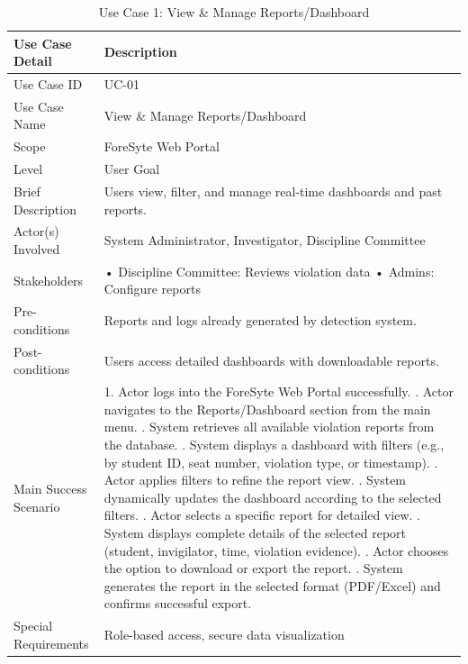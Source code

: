 \begin{longtable}{|p{5cm}|p{10cm}|}
\caption{Use Case 1: View \& Manage Reports/Dashboard} \label{uc01} \\

\hline
\textbf{Use Case Detail} & \textbf{Description} \\ \hline
Use Case ID & UC-01 \\ \hline
Use Case Name & View \& Manage Reports/Dashboard \\ \hline
Scope & ForeSyte Web Portal \\ \hline
Level & User Goal \\ \hline
Brief Description & Users view, filter, and manage real-time dashboards and past reports. \\ \hline
Actor(s) Involved & System Administrator, Investigator, Discipline Committee \\ \hline
Stakeholders & • Discipline Committee: Reviews violation data \newline • Admins: Configure reports \\ \hline
Pre-conditions & Reports and logs already generated by detection system. \\ \hline
Post-conditions & Users access detailed dashboards with downloadable reports. \\ \hline
Main Success Scenario & 
1. Actor logs into the ForeSyte Web Portal successfully. \newline
2. Actor navigates to the Reports/Dashboard section from the main menu. \newline
3. System retrieves all available violation reports from the database. \newline
4. System displays a dashboard with filters (e.g., by student ID, seat number, violation type, or timestamp). \newline
5. Actor applies filters to refine the report view. \newline
6. System dynamically updates the dashboard according to the selected filters. \newline
7. Actor selects a specific report for detailed view. \newline
8. System displays complete details of the selected report (student, invigilator, time, violation evidence). \newline
9. Actor chooses the option to download or export the report. \newline
10. System generates the report in the selected format (PDF/Excel) and confirms successful export. \\ \hline

Special Requirements & Role-based access, secure data visualization \\ \hline

\end{longtable}

